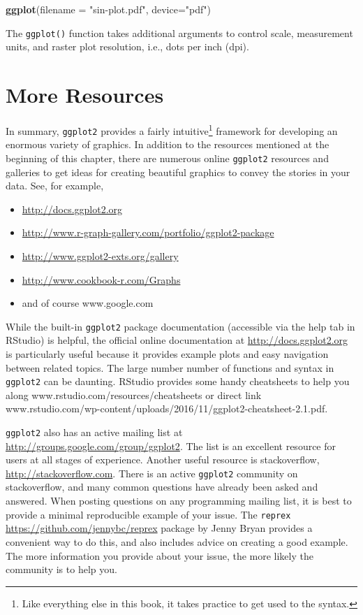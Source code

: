\documentclass[]{krantz}
\makeatletter
\newenvironment{Shaded}{\begin{snugshade}}{\end{snugshade}}
\newcommand{\KeywordTok}[1]{\textcolor[rgb]{0.27,0.27,0.27}{\textbf{#1}}}
\newcommand{\DataTypeTok}[1]{\textcolor[rgb]{0.27,0.27,0.27}{#1}}
\newcommand{\StringTok}[1]{\textcolor[rgb]{0.5,0.5,0.5}{#1}}
\newcommand{\NormalTok}[1]{#1}
\providecommand{\tightlist}{%
  \setlength{\itemsep}{0pt}\setlength{\parskip}{0pt}}
\newenvironment{kframe}{%
\medskip{}
\setlength{\fboxsep}{.8em}
 \def\at@end@of@kframe{}%
 \ifinner\ifhmode%
  \def\at@end@of@kframe{\end{minipage}}%
  \begin{minipage}{\columnwidth}%
 \fi\fi%
 \def\FrameCommand##1{\hskip\@totalleftmargin \hskip-\fboxsep
 \colorbox{shadecolor}{##1}\hskip-\fboxsep
     \hskip-\linewidth \hskip-\@totalleftmargin \hskip\columnwidth}%
 \MakeFramed {\advance\hsize-\width
   \@totalleftmargin\z@ \linewidth\hsize
   \@setminipage}}%
 {\par\unskip\endMakeFramed%
 \at@end@of@kframe}
\renewenvironment{Shaded}{\begin{kframe}}{\end{kframe}}
\makeatother
\begin{document}
\begin{Shaded}
\begin{Highlighting}[]
\KeywordTok{ggplot}\NormalTok{(}\DataTypeTok{filename =} \StringTok{"sin-plot.pdf"}\NormalTok{, }\DataTypeTok{device=}\StringTok{"pdf"}\NormalTok{)}
\end{Highlighting}
\end{Shaded}

The \texttt{ggplot()} function takes additional arguments to control
scale, measurement units, and raster plot resolution, i.e., dots per
inch (dpi).

\section{More Resources}\label{more-resources}

In summary, \texttt{ggplot2} provides a fairly intuitive\footnote{Like
  everything else in this book, it takes practice to get used to the
  syntax.} framework for developing an enormous variety of graphics. In
addition to the resources mentioned at the beginning of this chapter,
there are numerous online \texttt{ggplot2} resources and galleries to
get ideas for creating beautiful graphics to convey the stories in your
data. See, for example,

\begin{itemize}
\tightlist
\item
  \url{http://docs.ggplot2.org}
\item
  \url{http://www.r-graph-gallery.com/portfolio/ggplot2-package}
\item
  \url{http://www.ggplot2-exts.org/gallery}
\item
  \url{http://www.cookbook-r.com/Graphs}
\item
  and of course www.google.com
\end{itemize}

While the built-in \texttt{ggplot2} package documentation (accessible
via the help tab in RStudio) is helpful, the official online
documentation at \url{http://docs.ggplot2.org} is particularly useful
because it provides example plots and easy navigation between related
topics. The large number number of functions and syntax in
\texttt{ggplot2} can be daunting. RStudio provides some handy
cheatsheets to help you along www.rstudio.com/resources/cheatsheets or
direct link
www.rstudio.com/wp-content/uploads/2016/11/ggplot2-cheatsheet-2.1.pdf.

\texttt{ggplot2} also has an active mailing list at
\url{http://groups.google.com/group/ggplot2}. The list is an excellent
resource for users at all stages of experience. Another useful resource
is stackoverflow, \url{http://stackoverflow.com}. There is an active
\texttt{ggplot2} community on stackoverflow, and many common questions
have already been asked and answered. When posting questions on any
programming mailing list, it is best to provide a minimal reproducible
example of your issue. The \texttt{reprex}
\url{https://github.com/jennybc/reprex} package by Jenny Bryan provides
a convenient way to do this, and also includes advice on creating a good
example. The more information you provide about your issue, the more
likely the community is to help you.
\end{document}
